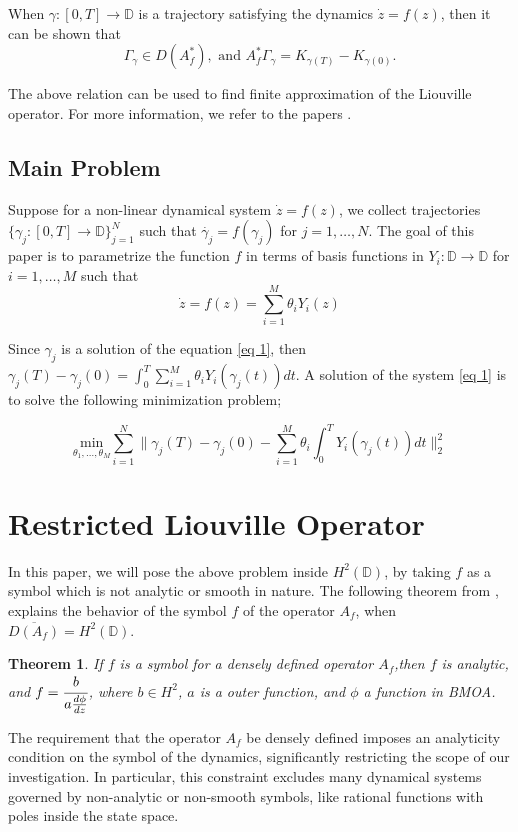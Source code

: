 \documentclass[preprint,12pt]{elsarticle} %
\theoremstyle{plain}
\newtheorem{theorem}{Theorem}[section]
\theoremstyle{definition}
\theoremstyle{remark}
\begin{document}
When $\gamma:[0,T]\rightarrow \mathbb{D}$ is a trajectory satisfying the dynamics $\dot{z}=f(z)$, then it can be shown that
$$
\Gamma_{\gamma}\in D(A_{f}^{*}),\text{~and~} A_{f}^{*}\Gamma_{\gamma}= K_{\gamma(T)}-K_{\gamma(0)}.
$$

The above relation can be used to find finite approximation of the Liouville operator. For more information, we refer to the papers \cite{rosenfeld2024occupation}.

\subsection{Main Problem}
Suppose for a non-linear dynamical system $\dot{z}=f(z)$, we collect trajectories $\{\gamma_j: [0,T]\rightarrow \mathbb{D}\}_{j=1}^{N}$ such that $\dot{\gamma_j}=f(\gamma_j)$ for $j=1,\ldots,N$. The goal of this paper is to parametrize the function $f$ in terms of basis functions in $Y_i:\mathbb{D}\rightarrow \mathbb{D}$ for $i=1,\ldots, M$ such that
\begin{equation}\label{eq 1}
\dot{z}= f(z)=\sum_{i=1}^{M}\theta_i Y_i(z)
\end{equation}


Since $\gamma_j$ is a solution of the equation \ref{eq 1}, then $\gamma_j(T)-\gamma_j(0)=\int_{0}^{T}\sum_{i=1}^{M}\theta_i Y_i(\gamma_j(t))dt$. A solution of the system \ref{eq 1} is to solve the following minimization problem;

$$
\boxed{\underset{\theta_1,\ldots,\theta_M}{\text{min}}\sum_{i=1}^{N}\Bigg\|\gamma_j(T)-\gamma_j(0)-\sum_{i=1}^{M}\theta_i \int_{0}^{T}Y_i(\gamma_j(t))dt\Bigg\|_{2}^{2}}
$$


\section{Restricted Liouville Operator}\label{Sec 4}

In this paper, we will pose the above problem inside $H^2(\mathbb{D})$, by taking $f$ as a symbol which is not analytic or smooth in nature. The following theorem from \cite{russo2022liouville}, explains the behavior of the symbol $f$ of the operator $A_f$, when $\overline{D(A_f)}=H^2(\mathbb{D})$.
 \begin{theorem}\label{thm rosen-russo}
     If $f$ is a symbol for a densely defined operator $A_f$,then $f$ is analytic, and $f=\cfrac{b}{a\frac{d\phi}{dz}}$, where $b\in H^2$, $a$ is a outer function, and $\phi$ a function in BMOA.
 \end{theorem}
The requirement that the operator $A_f$	be densely defined imposes an analyticity condition on the symbol of the dynamics, significantly restricting the scope of our investigation. In particular, this constraint excludes many dynamical systems governed by non-analytic or non-smooth symbols, like rational functions with poles inside the state space.
\end{document}

